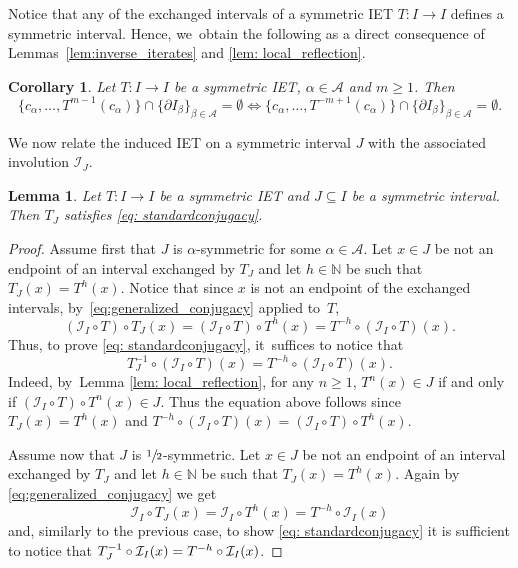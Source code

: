 \documentclass[JEP,XML,SOM,Unicode,NoEqCountersInSection,NoFloatCountersInSection,published]{cedram}
\theoremstyle{plain}
\newtheorem{lemma}[theorem]{Lemma}
\newtheorem{corollary}[theorem]{Corollary}
\theoremstyle{definition}
\newcommand{\A}{\mathcal{A}}
\newcommand{\I}{\mathcal{I}}
\newcommand{\N}{\mathbb{N}}
\begin{document}
Notice that any of the exchanged intervals of a symmetric IET $T: I \to I$ defines a symmetric interval. Hence, we~obtain the following as a direct consequence of Lem\-mas~\ref{lem:inverse_iterates} and \ref{lem: local_reflection}.

\begin{corollary}
Let $T : I \to I$ be a symmetric IET, $\alpha \in \A$ and $m \geq 1$. Then\vspace*{-3pt}
\[
\{c_\alpha, \ldots, T^{m - 1}(c_\alpha)\} \cap \{\partial I_\beta\}_{\beta \in \A} = \emptyset\iff \{c_\alpha, \ldots, T^{-m + 1}(c_\alpha)\} \cap \{\partial I_\beta\}_{\beta \in \A} = \emptyset.
\]
\end{corollary}

We now relate the induced IET on a symmetric interval $J$ with the associated involution $\I_J$.

\begin{lemma}
\label{lem:symmetric_condition}
Let $T : I \to I$ be a symmetric IET and $J \subseteq I$ be a symmetric interval. Then $T_J$ satisfies \eqref{eq: standardconjugacy}.\end{lemma}

\begin{proof}
Assume first that $J$ is $\alpha$-symmetric for some $\alpha\in\A$. Let $x\in J$ be not an endpoint of an interval exchanged by $T_J$ and let $h\in\N$ be such that $T_J(x)=T^{h}(x)$. Notice that since $x$ is not an endpoint of the exchanged intervals, by~\eqref{eq:generalized_conjugacy} applied to~$T$,\vspace*{-3pt}
\[
{(\I_I\circ T)\circ T_{J}(x)} = (\I_I\circ T) \circ T^h(x)=T^{-h}\circ (\I_I\circ T)(x).
\]
Thus, to prove \eqref{eq: standardconjugacy}, it~suffices to notice that\vspace*{-3pt}
\[
T_{J}^{-1}\circ (\I_I\circ T)(x) = T^{-h}\circ (\I_I\circ T)(x).
\]
Indeed, by~Lemma \ref{lem: local_reflection}, for any $n \geq 1$, $T^n(x) \in J$ if and only if $(\I_I\circ T) \circ T^n(x) \in J$. Thus the equation above follows since $T_J(x)=T^{h}(x)$ and $T^{-h}\circ (\I_I\circ T)(x) = (\I_I\circ T) \circ T^h(x)$.

Assume now that $J$ is $\sfrac{1}{2}$-symmetric. Let $x\in J$ be not an endpoint of an interval exchanged by $T_J$ and let $h\in\N$ be such that $T_J(x)=T^{h}(x)$. Again by \eqref{eq:generalized_conjugacy} we get\vspace*{-3pt}
\[
\I_I\circ T_{J}(x) = \I_I\circ T^h(x)=T^{-h}\circ \I_I(x)
\]
and, similarly to the previous case, to show \eqref{eq: standardconjugacy} it is sufficient to notice that $T_{J}^{-1}\circ\nobreak\I_I(x)=T^{-h}\circ\I_I(x)$.
\end{proof}
\end{document}
